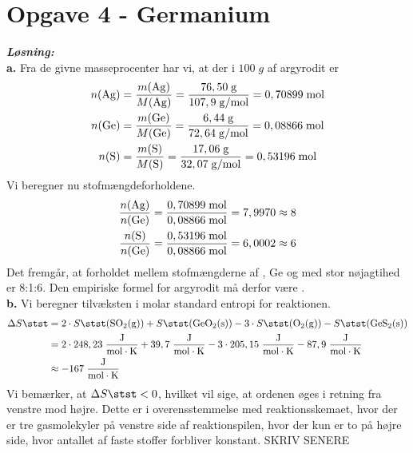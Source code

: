 \documentclass{report}
\newcommand{\sol}{\setlength{\parindent}{0cm}\textbf{\textit{Løsning:}}\setlength{\parindent}{1cm}}
\begin{document}
\section*{Opgave 4 - Germanium}
\sol \\
\textbf{a.}
Fra de givne masseprocenter har vi, at der i $100 \;\unit{g} $ af argyrodit er
\begin{equation*}
\begin{split}
  n(\ce{Ag} )&=\frac{m(\ce{Ag} )}{M(\ce{Ag} )}=\frac{76,50 \;\unit{g} }{107,9 \;\unit{g/mol} }=0,70899 \;\unit{mol} \\
  n(\ce{Ge} )&=\frac{m(\ce{Ge} )}{M(\ce{Ge} )}=\frac{6,44 \;\unit{g} }{72,64 \;\unit{g/mol} }= 0,08866 \;\unit{mol} \\
  n(\ce{S} )&=\frac{m(\ce{S} )}{M(\ce{S} )}=\frac{17,06 \;\unit{g} }{32,07 \;\unit{g/mol} }= 0,53196 \;\unit{mol} 
\end{split}
\end{equation*}
Vi beregner nu stofmængdeforholdene.
\begin{equation*}
\begin{split}
  \frac{n(\ce{Ag} )}{n(\ce{Ge} )}&=\frac{0,70899 \;\unit{mol} }{0,08866 \;\unit{mol} } = 7,9970 \approx  8\\
  \frac{n(\ce{S} )}{n(\ce{Ge} )}&=\frac{0,53196 \;\unit{mol} }{0,08866 \;\unit{mol} } =  6,0002\approx 6
\end{split}
\end{equation*}
Det fremgår, at forholdet mellem stofmængderne af , Ge og  med stor nøjagtihed er 8:1:6. 
Den empiriske formel for argyrodit må derfor være . \\[1ex]
\textbf{b.}
Vi beregner tilvæksten i molar standard entropi for reaktionen.
\begin{equation*}
\begin{split}
  \Delta S \stst &= 2 \cdot S \stst(\ce{SO2(g)} ) + S \stst(\ce{GeO2(s)} ) - 3 \cdot S \stst (\ce{O2(g)} ) - S \stst (\ce{GeS2(s)} )\\
  &=2 \cdot 248,23 \;\unit{\frac{J}{mol \cdot K}} + 39,7 \;\unit{\frac{J}{mol \cdot K}} - 3 \cdot 205,15 \;\unit{\frac{J}{mol \cdot K}} - 87,9 \;\unit{\frac{J}{mol \cdot K}} \\
  &\approx -167 \;\unit{\frac{J}{mol \cdot K}} 
\end{split}
\end{equation*}
Vi bemærker, at $\Delta S \stst <0$, hvilket vil sige, at ordenen øges i retning fra venstre mod højre.
Dette er i overensstemmelse med reaktionsskemaet, hvor der er tre gasmolekyler på venstre side af reaktionspilen, hvor der kun er to på højre side, hvor antallet af faste stoffer forbliver konstant.
SKRIV SENERE
\end{document}
